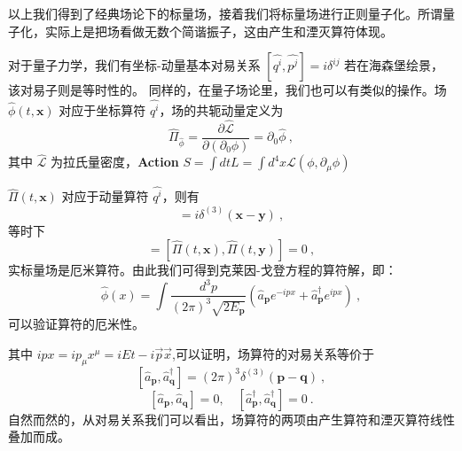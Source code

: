 \begin{corollary}{}
以上我们得到了经典场论下的标量场，接着我们将标量场进行正则量子化。所谓量子化，实际上是把场看做无数个简谐振子，这由产生和湮灭算符体现。

对于量子力学，我们有坐标-动量基本对易关系
$\left[\hat{q^{i}}, \hat{p^{j}}\right]=i \delta^{i j}$
若在海森堡绘景，该对易子则是等时性的。
同样的，在量子场论里，我们也可以有类似的操作。场 $\hat{\phi}(t, \mathbf{x})$ 对应于坐标算符 $\hat{q^{i}}$，场的共轭动量定义为
\begin{equation}
\hat{\Pi}_{\hat{\phi}}=\frac{\partial \hat{\mathcal{L}}}{\partial\left(\partial_{0} \phi\right)}=\partial_{0} \hat{\phi}~,
\end{equation}
其中 $\hat{\mathcal{L}}$ 为拉氏量密度，\textbf{Action} $S=\int d t L=\int d^{4} x \mathcal{L}\left(\phi, \partial_{\mu} \phi\right)$

$\hat{\Pi}(t, \mathbf{x})$ 对应于动量算符 $\hat{q^{i}}$，则有
\begin{equation}
[\hat{\phi}(t, \mathbf{x}), \hat{\Pi}(t, \mathbf{y})]=i \delta^{(3)}(\mathbf{x}-\mathbf{y})~,
\end{equation}
等时下
\begin{equation}
[\hat{\phi}(t, \mathbf{x}), \hat{\phi}(t, \mathbf{y})]=[\hat{\Pi}(t, \mathbf{x}), \hat{\Pi}(t, \mathbf{y})]=0~,
\end{equation}
实标量场是厄米算符。由此我们可得到克莱因-戈登方程的算符解，即：
\begin{equation}
\hat{\phi}(x)=\int \frac{d^{3} p}{(2 \pi)^{3} \sqrt{2 E_{\mathbf{p}}}}\left(\hat{a}_{\mathbf{p}} e^{-i p x}+\hat{a}_{\mathbf{p}}^{\dagger} e^{i p x}\right)~,
\end{equation}
可以验证算符的厄米性。

其中 $ipx=ip_\mu x^\mu=iEt-i\vec{p}\vec{x}$,可以证明，场算符的对易关系等价于
\begin{equation}
\left[\hat{a}_{\mathbf{p}}, \hat{a}_{\mathbf{q}}^{\dagger}\right]=(2 \pi)^{3} \delta^{(3)}(\mathbf{p}-\mathbf{q})~,
\end{equation}
\begin{equation}
\left[\hat{a}_{\mathbf{p}}, \hat{a}_{\mathbf{q}}\right]=0, \quad\left[\hat{a}_{\mathbf{p}}^{\dagger}, \hat{a}_{\mathbf{q}}^{\dagger}\right]=0~.
\end{equation}
自然而然的，从对易关系我们可以看出，场算符的两项由产生算符和湮灭算符线性叠加而成。
\end{corollary}
